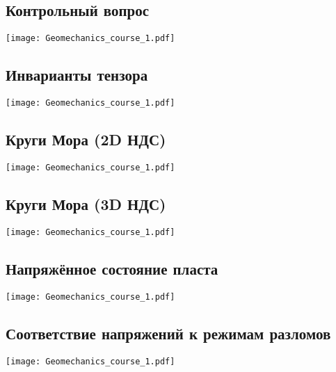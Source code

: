 \documentclass[main.tex]{subfiles}
\begin{document}
\subsection{Контрольный вопрос}

\begin{center}
\texttt{[image: Geomechanics\_course\_1.pdf]}
\end{center}

\subsection{Инварианты тензора}

\begin{center}
\texttt{[image: Geomechanics\_course\_1.pdf]}
\end{center}

\subsection{Круги Мора (2D НДС)}

\begin{center}
\texttt{[image: Geomechanics\_course\_1.pdf]}
\end{center}

\subsection{Круги Мора (3D НДС)}

\begin{center}
\texttt{[image: Geomechanics\_course\_1.pdf]}
\end{center}

\subsection{Напряжённое состояние пласта}

\begin{center}
\texttt{[image: Geomechanics\_course\_1.pdf]}
\end{center}

\subsection{Соответствие напряжений к режимам разломов}

\begin{center}
\texttt{[image: Geomechanics\_course\_1.pdf]}
\end{center}
\end{document}
